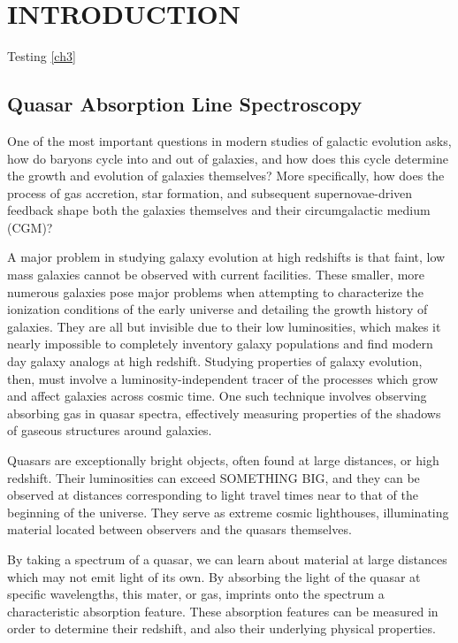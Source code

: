 \section{\MakeUppercase{Introduction}}
\label{ch1}

Testing \ref{ch3}

\subsection{Quasar Absorption Line Spectroscopy}
\label{ch1:absorptionlines}

One of the most important questions in modern studies of galactic evolution asks, how do baryons cycle into and out of galaxies, and how does this cycle determine the growth and evolution of galaxies themselves? More specifically, how does the process of gas accretion, star formation, and subsequent supernovae-driven feedback shape both the galaxies themselves and their circumgalactic medium (CGM)?

A major problem in studying galaxy evolution at high redshifts is that faint, low mass galaxies cannot be observed with current facilities. These smaller, more numerous galaxies pose major problems when attempting to characterize the ionization conditions of the early universe and detailing the growth history of galaxies. They are all but invisible due to their low luminosities, which makes it nearly impossible to completely inventory galaxy populations and find modern day galaxy analogs at high redshift. Studying properties of galaxy evolution, then, must involve a luminosity-independent tracer of the processes which grow and affect galaxies across cosmic time. One such technique involves observing absorbing gas in quasar spectra, effectively measuring properties of the shadows of gaseous structures around galaxies.

Quasars are exceptionally bright objects, often found at large distances, or high redshift. Their luminosities can exceed SOMETHING BIG, and they can be observed at distances corresponding to light travel times near to that of the beginning of the universe. They serve as extreme cosmic lighthouses, illuminating material located between observers and the quasars themselves.

By taking a spectrum of a quasar, we can learn about material at large distances which may not emit light of its own. By absorbing the light of the quasar at specific wavelengths, this mater, or gas, imprints onto the spectrum a characteristic absorption feature. These absorption features can be measured in order to determine their redshift, and also their underlying physical properties.

